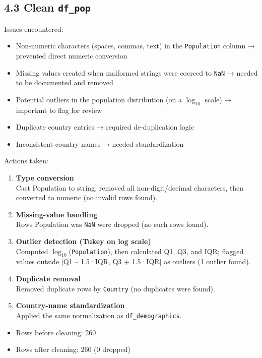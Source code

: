 \documentclass[14pt]{extarticle}
\begin{document}
\subsection*{4.3 Clean \texttt{df\_pop}}
Issues encountered:
\begin{itemize}
\item Non-numeric characters (spaces, commas, text) in the \texttt{Population} column
→ prevented direct numeric conversion
\item Missing values created when malformed strings were coerced to \texttt{NaN} →
needed to be documented and removed
\item Potential outliers in the population distribution (on a $\log_{10}$ scale) →
important to flag for review
\item Duplicate country entries → required de-duplication logic
\item Inconsistent country names → needed standardization
\end{itemize}
Actions taken:
\begin{enumerate}
\item \textbf{Type conversion}\\
Cast Population to string, removed all non-digit/decimal characters, then
converted to numeric (no invalid rows found).
\item \textbf{Missing-value handling}\\
  Rows Population was \texttt{NaN} were dropped (no such rows found).
\item \textbf{Outlier detection (Tukey on log scale)}\\
Computed $\log_{10}$(\texttt{Population}), then calculated Q1, Q3, and IQR; flagged
values outside [Q1 – 1.5·IQR, Q3 + 1.5·IQR] as outliers (1 outlier found).
\item \textbf{Duplicate removal}\\
  Removed duplicate rows by \texttt{Country} (no duplicates were found).
\item \textbf{Country-name standardization}\\
  Applied the same normalization as \texttt{df\_demographics}.
\end{enumerate}
\begin{itemize}
\item Rows before cleaning: 260
\item Rows after cleaning: 260 (0 dropped)
\end{itemize}
\end{document}
